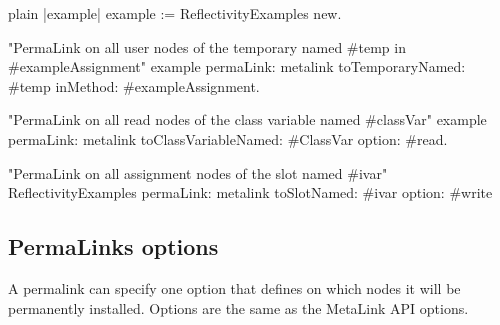 \documentclass[10pt,twoside,english]{_support/latex/sbabook/sbabook}
\begin{document}
\begin{displaycode}{plain}
|example|
example := ReflectivityExamples new.

"PermaLink on all user nodes of the temporary named #temp in #exampleAssignment"
example permaLink: metalink toTemporaryNamed: #temp inMethod: #exampleAssignment.

"PermaLink on all read nodes of the class variable named #classVar"
example permaLink: metalink toClassVariableNamed: #ClassVar option: #read.

"PermaLink on all assignment nodes of the slot named #ivar"
ReflectivityExamples permaLink: metalink toSlotNamed: #ivar option: #write
\end{displaycode}
\subsection{PermaLinks options}
A permalink can specify one option that defines on which nodes it will be permanently installed. Options are the same as the MetaLink API options.



\backmatter

\end{document}

